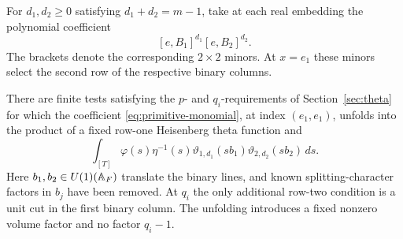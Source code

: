 For $d_1,d_2\geq0$ satisfying $d_1+d_2=m-1$, take at each real embedding
the polynomial coefficient
\begin{equation}\label{eq:primitive-monomial}
 [e,B_1]^{d_1}[e,B_2]^{d_2}.
\end{equation}
The brackets denote the corresponding $2\times2$ minors.  At $x=e_1$
these minors select the second row of the respective binary columns.

\begin{lemma}\label{lem:one-index-unfolding}
 There are finite tests satisfying the $p$- and $q_i$-requirements of
 Section~\ref{sec:theta} for which the coefficient
 \eqref{eq:primitive-monomial}, at index $(e_1,e_1)$, unfolds into the
 product of a fixed row-one Heisenberg theta function and
 \begin{equation}\label{eq:row-two-unfolding}
  \int_{[T]}\varphi(s)\eta^{-1}(s)
       \vartheta_{1,d_1}(sb_1)\vartheta_{2,d_2}(sb_2)\,ds.
 \end{equation}
 Here $b_1,b_2\in U(1)(\mathbb A_F)$ translate the binary lines, and known
 splitting-character factors in $b_j$ have been removed.  At $q_i$ the
 only additional row-two condition is a unit cut in the first binary
 column.  The unfolding introduces a fixed nonzero volume factor and
 no factor $q_i-1$.
\end{lemma}
